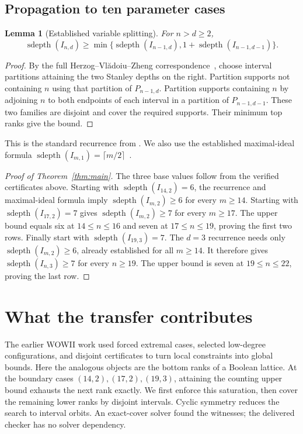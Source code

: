 \documentclass[11pt,a4paper]{article}
\newtheorem{lemma}[theorem]{Lemma}
\newcommand{\sd}{\operatorname{sdepth}}
\begin{document}
\subsection{Propagation to ten parameter cases}
\begin{lemma}[Established variable splitting]\label{lem:recurrence}
For $n>d\ge2$,
\[
\sd(I_{n,d})\ge\min\{\sd(I_{n-1,d}),1+\sd(I_{n-1,d-1})\}.
\]
\end{lemma}
\begin{proof}
By the full Herzog--Vl\u{a}doiu--Zheng correspondence~\cite{HVZ},
choose interval partitions attaining the two Stanley depths on the right.
Partition supports not containing $n$ using that partition of $P_{n-1,d}$.
Partition supports containing $n$ by adjoining $n$ to both endpoints
of each interval in a partition of $P_{n-1,d-1}$. These two families
are disjoint and cover the required supports. Their minimum top ranks
give the bound.
\end{proof}
This is the standard recurrence from \cite[Lemma~2.5]{KSSY}.
We also use the established maximal-ideal formula
$\sd(I_{m,1})=\lceil m/2\rceil$~\cite{Biro}.

\begin{proof}[Proof of Theorem~\ref{thm:main}]
The three base values follow from the verified certificates above.
Starting with $\sd(I_{14,2})=6$, the recurrence and maximal-ideal
formula imply $\sd(I_{m,2})\ge6$ for every $m\ge14$.
Starting with $\sd(I_{17,2})=7$ gives $\sd(I_{m,2})\ge7$ for every
$m\ge17$. The upper bound equals six at $14\le n\le16$ and seven
at $17\le n\le19$, proving the first two rows.
Finally start with $\sd(I_{19,3})=7$. The $d=3$ recurrence needs only
$\sd(I_{m,2})\ge6$, already established for all $m\ge14$.
It therefore gives $\sd(I_{n,3})\ge7$ for every $n\ge19$.
The upper bound is seven at $19\le n\le22$, proving the last row.
\end{proof}

\section{What the transfer contributes}
The earlier WOWII work used forced extremal cases, selected low-degree
configurations, and disjoint certificates to turn local constraints into
global bounds. Here the analogous objects are the bottom ranks of a
Boolean lattice. At the boundary cases $(14,2),(17,2),(19,3)$, attaining
the counting upper bound exhausts the next rank exactly. We first
enforce this saturation, then cover the remaining lower ranks by disjoint
intervals. Cyclic symmetry reduces the search to interval orbits.
An exact-cover solver found the witnesses; the delivered checker has
no solver dependency.
\end{document}
